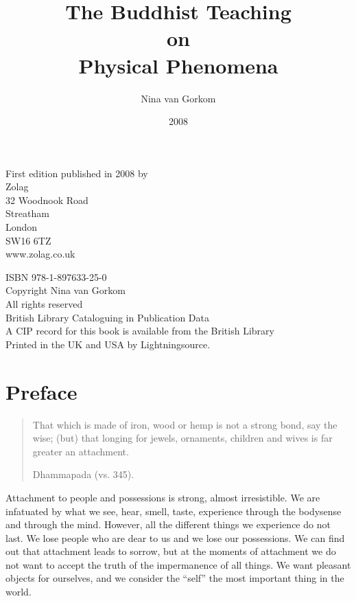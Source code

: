 \documentclass{book}
\title{The Buddhist Teaching\\on\\Physical Phenomena}
\author{Nina van Gorkom}
\date{2008}
\begin{document}
\maketitle
\vspace*{10pt}
\noindent First edition published in 2008 by\\
Zolag\\
32 Woodnook Road\\
Streatham\\
London\\
SW16 6TZ\\
www.zolag.co.uk\\
\vspace{10pt}

\noindent ISBN 978-1-897633-25-0\\ 
Copyright Nina van Gorkom\\
All rights reserved\\
British Library Cataloguing in Publication Data\\
A CIP record for this book is available from the British Library\\
Printed in the UK and USA by
Lightningsource.
\frontmatter
\tableofcontents
\chapter{Preface}



\begin{quote}\begin{raggedright}
That which is made of iron, wood or hemp is not a strong bond, say the
wise; (but) that longing for jewels, ornaments, children and wives is
far greater an attachment.

Dhammapada
(vs. 345).
\end{raggedright}\end{quote}




Attachment to people and possessions is strong, almost irresist\-ible. We
are infatuated by what we see, hear, smell, taste, experience through
the bodysense and through the mind. However, all the different things
we experience do not last. We lose people who are dear to us and we
lose our possessions. We can find out that attachment leads to sorrow,
but at the moments of attachment we do not want to accept the truth of
the impermanence of all things. We want pleasant objects for ourselves,
and we consider the ``self'' the most important thing in the world. 
\end{document}
